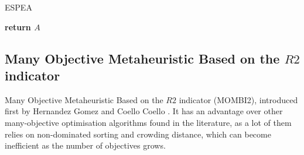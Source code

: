 \begin{algorithm}[H]
\label{espea_alg}
\caption{ESPEA}
\SetAlgoLined
{}
\textbf{return $A$}
\end{algorithm}


\subsection{Many Objective Metaheuristic Based on the $R2$ indicator}

Many Objective Metaheuristic Based on the $R2$ indicator (MOMBI2), introduced first by Hernandez Gomez and Coello Coello \cite{hernandez2015improved}. It has an advantage over other many-objective optimisation algorithms found in the literature, as a lot of them relies on non-dominated sorting and crowding distance, which can become inefficient as the number of objectives grows. 


